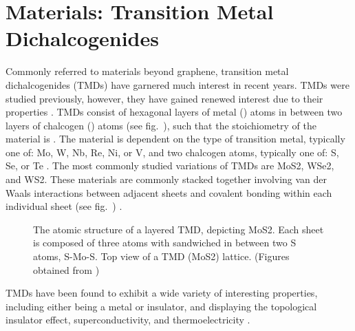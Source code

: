 \section{\Td Materials: Transition Metal Dichalcogenides}\label{sec:tmds}
Commonly referred to \td materials beyond graphene, transition metal dichalcogenides (TMDs) have garnered much interest in recent years. \acp{TMD} were studied previously, however, they have gained renewed interest due to their properties \cite{Frindt_Royal1963,Fivaz_PhysRev1967,Mattheiss_PhysRevB1973,Wilson_AdvPhys1969}. \acp{TMD} consist of hexagonal layers of metal () atoms in between two layers of chalcogen () atoms (see fig.~), such that the stoichiometry of the material is  \cite{Xu_ChemRev2013}. The material is dependent on the type of transition metal, typically one of: \ac{Mo}, \ac{W}, \ac{Nb}, \ac{Re}, \ac{Ni}, or \ac{V}, and two chalcogen atoms, typically one of: \ac{S}, \ac{Se}, or \ac{Te} \cite{Wilson_AdvPhys1969,Wells_Oxford1984}. The most commonly studied variations of \acp{TMD} are \ac{MoS2}, \ac{WSe2}, and \ac{WS2}. These materials are commonly stacked together involving van der Waals interactions between adjacent sheets and covalent bonding within each individual sheet (see fig.~) \cite{Xu_ChemRev2013}.
\begin{figure}[ht]
	\centering
	\qquad
	\caption[Hexagonal lattice structure of \acs{TMD}]{\protect{} The atomic structure of a layered \acs{TMD}, depicting \acs{MoS2}. Each sheet is composed of three atoms with  sandwiched in between two \acs{S} atoms, \acs{S}-\acs{Mo}-\acs{S}. \protect{} Top view of a \acs{TMD} (\acs{MoS2}) lattice. (Figures obtained from \cite{Kis_NatureNano2011})}
\end{figure}
\acp{TMD} have been found to exhibit a wide variety of interesting properties, including either being a metal or insulator, and displaying the topological insulator effect, superconductivity, and thermoelectricity \cite{Lang_ACSnano2012,Zhang_AdvMat2012,Xie_AppPhysLett2009,Gamble_JournChemPhys1975}.

